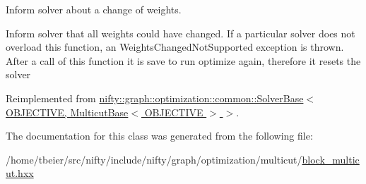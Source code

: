 Inform solver about a change of weights. 

Inform solver that all weights could have changed. If a particular solver does not overload this function, an Weights\+Changed\+Not\+Supported exception is thrown. After a call of this function it is save to run optimize again, therefore it resets the solver 

Reimplemented from \hyperlink{classnifty_1_1graph_1_1optimization_1_1common_1_1SolverBase_a8ab38d61068370e24cca475ef1b5d8b1}{nifty\+::graph\+::optimization\+::common\+::\+Solver\+Base$<$ O\+B\+J\+E\+C\+T\+I\+V\+E, Multicut\+Base$<$ O\+B\+J\+E\+C\+T\+I\+V\+E $>$ $>$}.



The documentation for this class was generated from the following file\+:\begin{DoxyCompactItemize}
\item 
/home/tbeier/src/nifty/include/nifty/graph/optimization/multicut/\hyperlink{block__multicut_8hxx}{block\+\_\+multicut.\+hxx}\end{DoxyCompactItemize}
